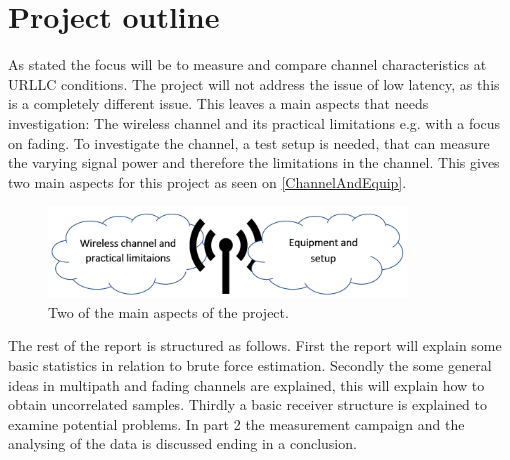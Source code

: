 \section{Project outline}

As stated the focus will be to measure and compare channel characteristics at URLLC conditions. The project will not address the issue of low latency, as this is a completely different issue. This leaves a main aspects that needs investigation: The wireless channel and its practical limitations e.g. with a focus on fading. To investigate the channel, a test setup is needed, that can measure the varying signal power and therefore the limitations in the channel. This gives two main aspects for this project as seen on \autoref{ChannelAndEquip}.

\begin{figure}[H]
\centering
\includegraphics[width=0.85\textwidth]{figures/ProOutline.png}
\caption{Two of the main aspects of the project.}
\label{ChannelAndEquip}
\end{figure}


The rest of the report is structured as follows. First the report will explain some basic statistics in relation to brute force estimation. Secondly the some general ideas in multipath and fading channels are explained, this will explain how to obtain uncorrelated samples. Thirdly a basic receiver structure is explained to examine potential problems. In part 2 the measurement campaign and the analysing of the data is discussed ending in a conclusion.


 




